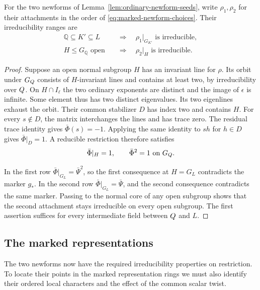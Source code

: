 \begin{lemma}
\label{lem:marked-newform-restriction}
For the two newforms of Lemma~\ref{lem:ordinary-newform-seeds}, write \(\rho_1,\rho_2\) for their attachments in the order of
\eqref{eq:marked-newform-choices}. Their irreducibility ranges are
\[
 \begin{aligned}
 \mathbb Q\subseteq K'\subseteq L&\quad\Longrightarrow\quad
                 \rho_1|_{G_{K'}}\text{ is irreducible},\\
 H\le G_{\mathbb Q}\text{ open}&\quad\Longrightarrow\quad
                 \rho_2|_H\text{ is irreducible}.
 \end{aligned}
\]
\end{lemma}
\begin{proof}
Suppose an open normal subgroup \(H\) has an invariant line for
\(\rho\). Its orbit under \(G_Q\) consists of \(H\)-invariant
lines and contains at least two, by irreducibility over \(Q\).
On \(H\cap I_\ell\) the two ordinary exponents are distinct and
the image of \(\epsilon\) is infinite. Some element thus has two
distinct eigenvalues. Its two eigenlines exhaust the orbit.
Their common stabilizer \(D\) has index two and contains \(H\).
For every \(s\notin D\), the matrix interchanges the lines and
has trace zero. The residual trace identity gives
\(\bar\Phi(s)=-1\). Applying the same identity to \(sh\) for
\(h\in D\) gives \(\bar\Phi|_D=1\). A reducible restriction therefore satisfies
\[
                  \bar\Phi|_H=1,\qquad \bar\Phi^2=1
                       \ \text{on }G_Q .
\]

In the first row \(\bar\Phi|_{G_L}=\bar\Psi^2\), so the first
consequence at \(H=G_L\) contradicts the marker \(g_*\).
In the second row \(\bar\Phi|_{G_L}=\bar\Psi\), and the second
consequence contradicts the same marker. Passing to the normal
core of any open subgroup shows that the second attachment stays
irreducible on every open subgroup. The first assertion suffices
for every intermediate field between \(Q\) and \(L\).

\end{proof}

\subsection{The marked representations}

The two newforms now have the required irreducibility properties on restriction. To locate their points in the marked representation rings we must also identify their ordered local characters and the effect of the common scalar twist.

